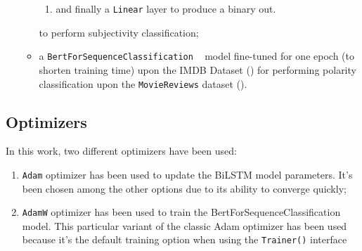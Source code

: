 \begin{itemize}
\begin{itemize}
\begin{enumerate}
                    \item and finally a \texttt{Linear} layer to produce a binary out.

                \end{enumerate}
                to perform subjectivity classification;

            \item a \texttt{BertForSequenceClassification} ~\cite{sequence} model fine-tuned for one epoch 
                (to shorten training time) upon the IMDB Dataset (\textbf{}) for performing polarity classification 
                upon the \texttt{MovieReviews} dataset (\textbf{}).

        \end{itemize}
\end{itemize}

\subsection{Optimizers}
\label{subsec:opt}
In this work, two different optimizers have been used:
\begin{enumerate}
    \item \texttt{Adam} optimizer has been used to update the BiLSTM model parameters. It's been chosen among the other options due to
        its ability to converge quickly;
    \item \texttt{AdamW} optimizer has been used to train the BertForSequenceClassification model. This particular variant of the classic 
        Adam optimizer has been used because it's the default training option when using the \texttt{Trainer()} interface ~\cite{trainer} 
\end{enumerate}

